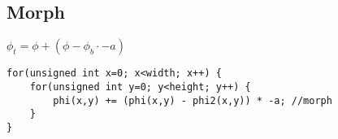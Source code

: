 
\subsection{Morph}


$\phi_t = \phi + (\phi - \phi_b \cdot -a)$

\begin{lstlisting}
for(unsigned int x=0; x<width; x++) {
    for(unsigned int y=0; y<height; y++) {
        phi(x,y) += (phi(x,y) - phi2(x,y)) * -a; //morph
    }
}
\end{lstlisting}



